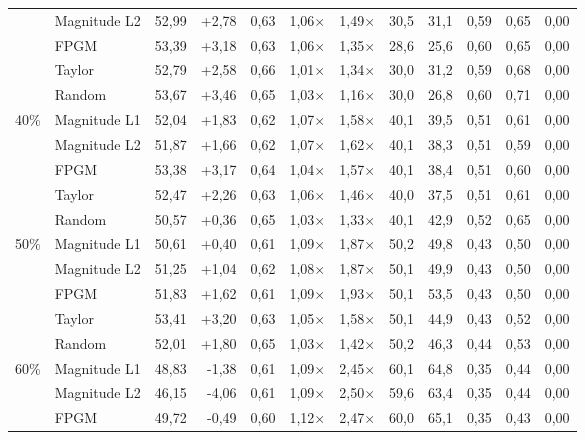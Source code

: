 \begin{table}[H]
{{\begin{tabular}{c l rr rrr rr rrr}
     & Magnitude L2 & 52,99 & +2,78 & 0,63 & 1,06$\times$ & 1,49$\times$ & 30,5 & 31,1 & 0,59 & 0,65 & 0,00 \\
     & FPGM & 53,39 & +3,18 & 0,63 & 1,06$\times$ & 1,35$\times$ & 28,6 & 25,6 & 0,60 & 0,65 & 0,00 \\
     & Taylor & 52,79 & +2,58 & 0,66 & 1,01$\times$ & 1,34$\times$ & 30,0 & 31,2 & 0,59 & 0,68 & 0,00 \\
     & Random & 53,67 & +3,46 & 0,65 & 1,03$\times$ & 1,16$\times$ & 30,0 & 26,8 & 0,60 & 0,71 & 0,00 \\
    \midrule
    \multirow{5}{*}{40\%} & Magnitude L1 & 52,04 & +1,83 & 0,62 & 1,07$\times$ & 1,58$\times$ & 40,1 & 39,5 & 0,51 & 0,61 & 0,00 \\
     & Magnitude L2 & 51,87 & +1,66 & 0,62 & 1,07$\times$ & 1,62$\times$ & 40,1 & 38,3 & 0,51 & 0,59 & 0,00 \\
     & FPGM & 53,38 & +3,17 & 0,64 & 1,04$\times$ & 1,57$\times$ & 40,1 & 38,4 & 0,51 & 0,60 & 0,00 \\
     & Taylor & 52,47 & +2,26 & 0,63 & 1,06$\times$ & 1,46$\times$ & 40,0 & 37,5 & 0,51 & 0,61 & 0,00 \\
     & Random & 50,57 & +0,36 & 0,65 & 1,03$\times$ & 1,33$\times$ & 40,1 & 42,9 & 0,52 & 0,65 & 0,00 \\
    \midrule
    \multirow{5}{*}{50\%} & Magnitude L1 & 50,61 & +0,40 & 0,61 & 1,09$\times$ & 1,87$\times$ & 50,2 & 49,8 & 0,43 & 0,50 & 0,00 \\
     & Magnitude L2 & 51,25 & +1,04 & 0,62 & 1,08$\times$ & 1,87$\times$ & 50,1 & 49,9 & 0,43 & 0,50 & 0,00 \\
     & FPGM & 51,83 & +1,62 & 0,61 & 1,09$\times$ & 1,93$\times$ & 50,1 & 53,5 & 0,43 & 0,50 & 0,00 \\
     & Taylor & 53,41 & +3,20 & 0,63 & 1,05$\times$ & 1,58$\times$ & 50,1 & 44,9 & 0,43 & 0,52 & 0,00 \\
     & Random & 52,01 & +1,80 & 0,65 & 1,03$\times$ & 1,42$\times$ & 50,2 & 46,3 & 0,44 & 0,53 & 0,00 \\
    \midrule
    \multirow{5}{*}{60\%} & Magnitude L1 & 48,83 & -1,38 & 0,61 & 1,09$\times$ & 2,45$\times$ & 60,1 & 64,8 & 0,35 & 0,44 & 0,00 \\
     & Magnitude L2 & 46,15 & -4,06 & 0,61 & 1,09$\times$ & 2,50$\times$ & 59,6 & 63,4 & 0,35 & 0,44 & 0,00 \\
     & FPGM & 49,72 & -0,49 & 0,60 & 1,12$\times$ & 2,47$\times$ & 60,0 & 65,1 & 0,35 & 0,43 & 0,00 \\

\end{tabular}}}
\end{table}
